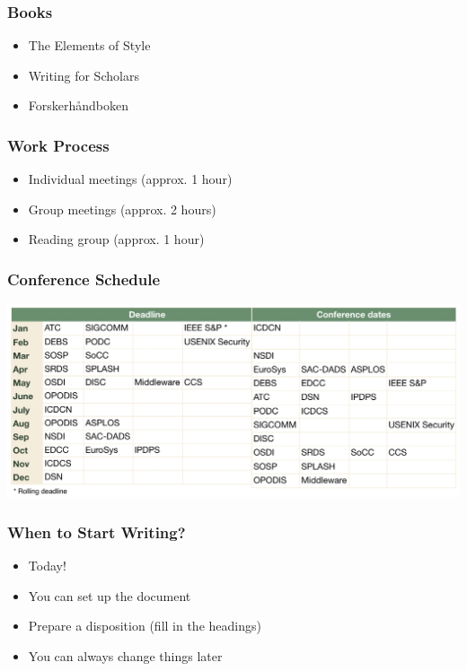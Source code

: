 \documentclass[hyperref={pdfpagelabels=false,linkcolor=blue}, aspectratio=1610]{beamer}
\begin{document}
\begin{frame}
\frametitle{Books}
\begin{block}{}
 \begin{itemize}
  \item The Elements of Style
  \item Writing for Scholars
  \item Forskerhåndboken
 \end{itemize}
\end{block}
\end{frame}

\begin{frame}
\frametitle{Work Process}
\begin{block}{}
 \begin{itemize}
  \item Individual meetings (approx. 1 hour)
  \item Group meetings (approx. 2 hours)
  \item Reading group (approx. 1 hour)
 \end{itemize}
\end{block}
\end{frame}

\begin{frame}
\frametitle{Conference Schedule}
 \includegraphics[scale=0.25]{fig/ConferenceSchedule.png}
\end{frame}

\begin{frame}
\frametitle{When to Start Writing?}
\begin{block}{}
 \begin{itemize}
  \item<2-> Today!
  \item<2-> You can set up the document 
  \item<2-> Prepare a disposition (fill in the headings)
  \item<2-> You can always change things later
 \end{itemize}
\end{block}
\end{frame}
\end{document}
